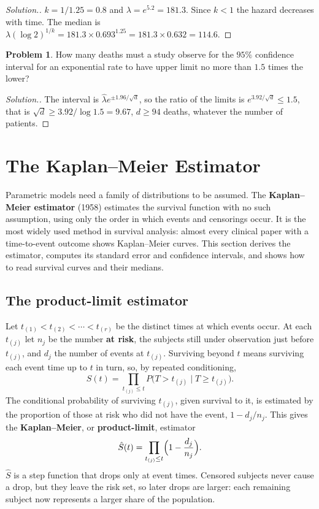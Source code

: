 \documentclass[11pt,a4paper]{article}
\numberwithin{equation}{section}
\theoremstyle{definition}
\newtheorem{problemx}{Problem}[subsection]
\newenvironment{problem}{\begin{problemx}}{\end{problemx}}
\newenvironment{solution}
  {\renewcommand{\qedsymbol}{}\begin{proof}[\textit{Solution}.]}
  {\end{proof}}
\begin{document}
\begin{solution}
$k = 1/1.25 = 0.8$ and $\lambda = e^{5.2} = 181.3$. Since $k < 1$ the hazard decreases with time. The median is $\lambda(\log 2)^{1/k} = 181.3 \times 0.693^{1.25} = 181.3 \times 0.632 = 114.6$.
\end{solution}

\begin{problem}
How many deaths must a study observe for the $95\%$ confidence interval for an exponential rate to have upper limit no more than $1.5$ times the lower?
\end{problem}

\begin{solution}
The interval is $\hat\lambda e^{\pm1.96/\sqrt d}$, so the ratio of the limits is $e^{3.92/\sqrt d} \leq 1.5$, that is $\sqrt d \geq 3.92/\log 1.5 = 9.67$, $d \geq 94$ deaths, whatever the number of patients.
\end{solution}

\section{The Kaplan--Meier Estimator}
\label{sec:km}

Parametric models need a family of distributions to be assumed. The \textbf{Kaplan--Meier estimator} (1958) estimates the survival function with no such assumption, using only the order in which events and censorings occur. It is the most widely used method in survival analysis: almost every clinical paper with a time-to-event outcome shows Kaplan--Meier
curves. This section derives the estimator, computes its standard error and confidence intervals, and shows how to read survival curves and their medians.

\subsection{The product-limit estimator}
\label{ssec:productlimit}

Let $t_{(1)} < t_{(2)} < \cdots < t_{(r)}$ be the distinct times at which events occur. At each $t_{(j)}$ let $n_j$ be the number \textbf{at risk}, the subjects still under observation just before $t_{(j)}$, and $d_j$ the number of events at $t_{(j)}$. Surviving beyond $t$ means surviving each event time up to $t$ in turn, so, by repeated conditioning,
\[
S(t) = \prod_{t_{(j)} \leq t}P\bigl(T > t_{(j)} \mid T \geq t_{(j)}\bigr) .
\]
The conditional probability of surviving $t_{(j)}$, given survival to it, is estimated by the proportion of those at risk who did not have the event, $1 - d_j/n_j$. This gives the \textbf{Kaplan--Meier}, or \textbf{product-limit}, estimator
\[
\hat S(t) = \prod_{t_{(j)} \leq t}\Bigl(1 - \frac{d_j}{n_j}\Bigr) .
\]
$\hat S$ is a step function that drops only at event times. Censored subjects never cause a drop, but they leave the risk set, so later drops are larger: each remaining subject now represents a larger share of the population.
\end{document}

